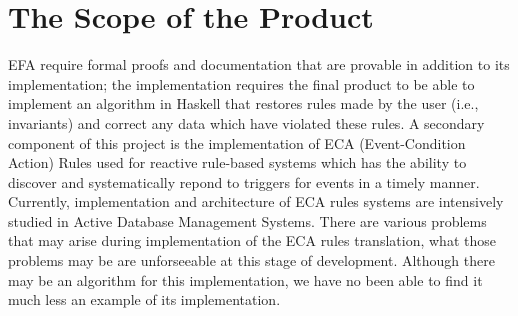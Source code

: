 \documentclass[12pt]{report}
\begin{document}
\section{The Scope of the Product}\label{sec:ScopeOfProduct}
EFA require formal proofs and documentation that are provable in addition to its implementation; 
the implementation requires the final product to be able to implement an algorithm in Haskell that 
restores rules made by the user (i.e., invariants) and correct any data which have violated these 
rules. A secondary component of this project is the implementation of ECA (Event-Condition 
Action) Rules used for reactive rule-based systems which has the ability to discover and 
systematically repond to triggers for events in a timely manner. 
Currently, implementation and architecture of ECA rules systems are intensively studied in Active 
Database Management Systems. %
There are various problems that may arise during implementation of the ECA rules translation, 
what those problems may be are unforseeable at this stage of development. Although there may be an 
algorithm for this implementation, we have no been able to find it much less an example of its 
implementation.
\end{document}
